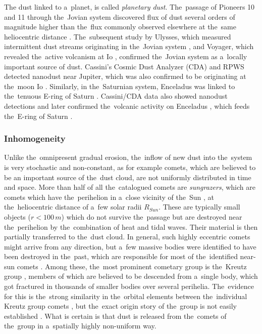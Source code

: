 The dust linked to a~planet, is called \textit{planetary dust}. The~passage of Pioneers 10 and 11 through the~Jovian system discovered flux of dust several orders of magnitude higher than the~flux commonly observed elsewhere at the~same heliocentric distance \citep{humes1974interplanetary}. The~subsequent study by Ulysses, which measured intermittent dust streams originating in the~Jovian system \citep{grun1993discovery}, and Voyager, which revealed the~active volcanism at Io \citep{kruger2004jovian}, confirmed the~Jovian system as a~locally important source of dust. Cassini's Cosmic Dust Analyzer ({CDA}) and RPWS detected nanodust near Jupiter, which was also confirmed to be originating at the~moon Io \citep{meyer2009detecting}. Similarly, in the~Saturnian system, Enceladus was linked to the~tenuous E-ring of Saturn \citep{baum1981saturn}. Cassini/CDA data also showed nanodust detections \citep{kempf2005high} and later confirmed the~volcanic activity on Enceladus \citep{spahn2006cassini}, which feeds the~E-ring of Saturn \citep{kempf2010enceladus}. 

\subsubsection{Inhomogeneity}

Unlike the~omnipresent gradual erosion, the~inflow of new dust into the~system is very stochastic and non-constant, as for example comets, which are believed to be an important source of the~dust cloud, are not uniformly distributed in time and space. More than half of all the~catalogued comets are \textit{sungrazers}, which are comets which have the~perihelion in a~close vicinity of the~Sun \citep{jones2018science}, at the~heliocentric distance of a~few solar radii $R_{Sun}$. These are typically small objects ($r<100 \, \si{m}$) which do not survive the~passage but are destroyed near the~perihelion by the~combination of heat and tidal waves. Their material is then partially transferred to the~dust cloud. In general, such highly eccentric comets might arrive from any direction, but a~few massive bodies were identified to have been destroyed in the~past, which are responsible for most of the~identified near-sun comets \citep{jones2018science}. Among these, the~most prominent cometary group is the~{Kreutz group} \citep{kreutz1888untersuchungen}, members of which are believed to be descended from a~single body, which got fractured in thousands of smaller bodies over several perihelia. The~evidence for this is the~strong similarity in the~orbital elements between the~individual Kreutz group comets \citep{jones2018science}, but the~exact origin story of the~group is not easily established \citep{kalinicheva2017specific,fernandez2021origin}. What is certain is that dust is released from the~comets of the~group in a~spatially highly non-uniform way. 

